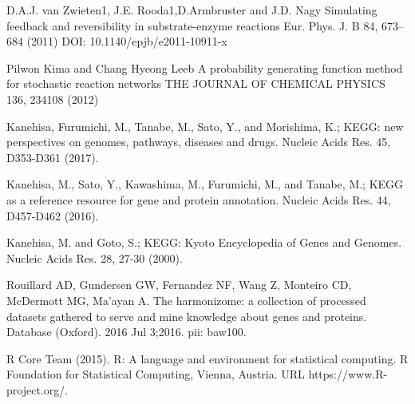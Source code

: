 
\begin{thebibliography}{00}

 D.A.J. van Zwieten1, J.E. Rooda1,D.Armbruster and J.D. Nagy
\newblock Simulating feedback and reversibility in substrate-enzyme reactions
\newblock Eur. Phys. J. B 84, 673–684 (2011) DOI: 10.1140/epjb/e2011-10911-x

 Pilwon Kima and Chang Hyeong Leeb
\newblock A probability generating function method for stochastic reaction networks
\newblock THE JOURNAL OF CHEMICAL PHYSICS 136, 234108 (2012)

 Kanehisa, Furumichi, M., Tanabe, M., Sato, Y., and Morishima, K.; 
\newblock KEGG: new perspectives on genomes, pathways, diseases and drugs. 
\newblock Nucleic Acids Res. 45, D353-D361 (2017).

 Kanehisa, M., Sato, Y., Kawashima, M., Furumichi, M., and Tanabe, M.; 
\newblock KEGG as a reference resource for gene and protein annotation. 
\newblock Nucleic Acids Res. 44, D457-D462 (2016).

 Kanehisa, M. and Goto, S.; 
\newblock KEGG: Kyoto Encyclopedia of Genes and Genomes. 
\newblock Nucleic Acids Res. 28, 27-30 (2000). 

 Rouillard AD, Gundersen GW, Fernandez NF, Wang Z, Monteiro CD, McDermott MG, Ma'ayan A. 
\newblock The harmonizome: a collection of processed datasets gathered to serve and mine knowledge about genes and proteins. 
\newblock Database (Oxford). 2016 Jul 3;2016. pii: baw100.

R Core Team (2015). 
\newblock R: A language and environment for statistical computing. R Foundation for Statistical Computing, Vienna, Austria.
\newblock URL https://www.R-project.org/.


\end{thebibliography}

